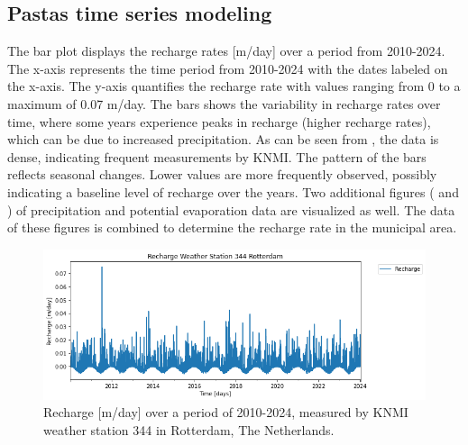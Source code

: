 \subsection{Pastas time series modeling}
The bar plot displays the recharge rates [m/day] over a period from 2010-2024. The x-axis represents the time period from 2010-2024 with the dates labeled on the x-axis. The y-axis quantifies the recharge rate with values ranging from 0 to a maximum of 0.07 m/day. The bars shows the variability in recharge rates over time, where some years experience peaks in recharge (higher recharge rates), which can be due to increased precipitation. As can be seen from , the data is dense, indicating frequent measurements by KNMI. The pattern of the bars reflects seasonal changes. Lower values are more frequently observed, possibly indicating a baseline level of recharge over the years. Two additional figures ( and ) of precipitation and potential evaporation data are visualized as well. The data of these figures is combined to determine the recharge rate in the municipal area. 

\begin{figure}[htbp]
    \centering
    \includegraphics[width=0.80\linewidth]{frontmatter/Rozenburg-fig/Recharge.png}
    \caption{Recharge [m/day] over a period of 2010-2024, measured by KNMI weather station 344 in Rotterdam, The Netherlands.}
    \label{recharge}
\end{figure}

